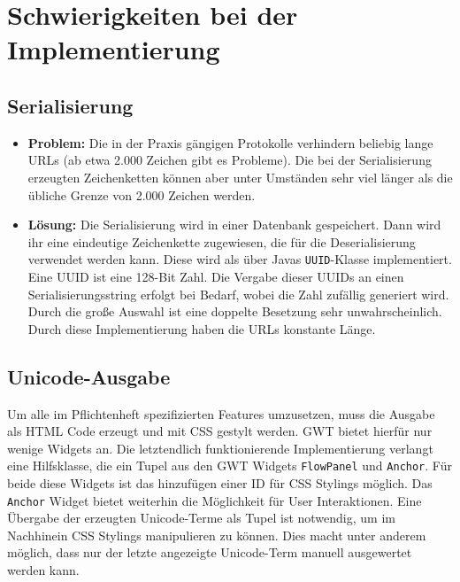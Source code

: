 \documentclass[parskip=full,11pt]{scrartcl}
\begin{document}
\section{Schwierigkeiten bei der Implementierung}
\subsection{Serialisierung}
\begin{itemize}
\item[] \textbf{Problem:}
Die in der Praxis gängigen Protokolle verhindern beliebig lange URLs (ab etwa 2.000 Zeichen gibt es Probleme).
Die bei der Serialisierung erzeugten Zeichenketten können aber unter Umständen sehr viel länger als die übliche Grenze von 2.000 Zeichen werden.
\item[] \textbf{Lösung:}
Die Serialisierung wird in einer Datenbank gespeichert.
Dann wird ihr eine eindeutige Zeichenkette zugewiesen, die für die Deserialisierung verwendet werden kann.
Diese wird als über Javas \texttt{UUID}-Klasse implementiert.
Eine UUID ist eine 128-Bit Zahl.
Die Vergabe dieser UUIDs an einen Serialisierungsstring erfolgt bei Bedarf, wobei die Zahl zufällig generiert wird.
Durch die große Auswahl ist eine doppelte Besetzung sehr unwahrscheinlich.
Durch diese Implementierung haben die URLs konstante Länge.
\end{itemize}

\subsection{Unicode-Ausgabe}
Um alle im Pflichtenheft spezifizierten Features umzusetzen, muss die Ausgabe als HTML Code erzeugt und mit CSS gestylt werden. GWT bietet hierfür nur wenige Widgets an. Die letztendlich funktionierende Implementierung verlangt eine Hilfsklasse, die ein Tupel aus den GWT Widgets \texttt{FlowPanel} und \texttt{Anchor}. Für beide diese Widgets ist das hinzufügen einer ID für CSS Stylings möglich. Das \texttt{Anchor} Widget bietet weiterhin die Möglichkeit für User Interaktionen. Eine Übergabe der erzeugten Unicode-Terme als Tupel ist notwendig, um im Nachhinein CSS Stylings manipulieren zu können. Dies macht unter anderem möglich, dass nur der letzte angezeigte Unicode-Term manuell ausgewertet werden kann.
\end{document}
